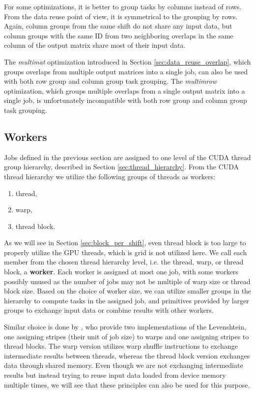 For some optimizations, it is better to group tasks by columns instead of rows. From the data reuse point of view, it is symmetrical to the grouping by rows. Again, column groups from the same shift do not share any input data, but column groups with the same ID from two neighboring overlaps in the same column of the output matrix share most of their input data.

The \textit{multimat} optimization introduced in Section \ref{sec:data_reuse_overlap}, which groups overlaps from multiple output matrices into a single job, can also be used with both row group and column group task grouping. The \textit{multimrow} optimization, which groups multiple overlaps from a single output matrix into a single job, is unfortunately incompatible with both row group and column group task grouping.

\subsection{Workers}



Jobs defined in the previous section are assigned to one level of the CUDA thread group hierarchy, described in Section \ref{sec:thread_hierarchy}. From the CUDA thread hierarchy we utilize the following groups of threads as workers:
\begin{enumerate}
	\item thread,
	\item warp,
	\item thread block.
\end{enumerate}

As we will see in Section \ref{sec:block_per_shift}, even thread block is too large to properly utilize the GPU threads, which is grid is not utilized here.
We call each member from the chosen thread hierarchy level, i.e. the thread, warp, or thread block, a \textbf{worker}. Each worker is assigned at most one job, with some workers possibly unused as the number of jobs may not be multiple of warp size or thread block size. Based on the choice of worker size, we can utilize smaller groups in the hierarchy to compute tasks in the assigned job, and primitives provided by larger groups to exchange input data or combine results with other workers.


Similar choice is done by \citep{paper:levenstein}, who provide two implementations of the Levenshtein, one assigning stripes (their unit of job size) to warps and one assigning stripes to thread blocks. The warp version utilizes warp shuffle instructions to exchange intermediate results between threads, whereas the thread block version exchanges data through shared memory. Even though we are not exchanging intermediate results but instead trying to reuse input data loaded from device memory multiple times, we will see that these principles can also be used for this purpose. %

